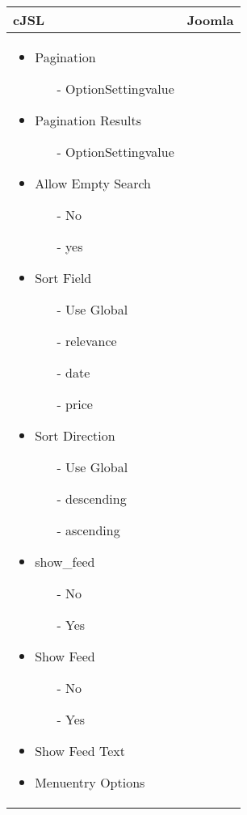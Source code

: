 \begin{minipage}{0.7\textwidth}
\begin{tabular}{|p{} | p{}|}
\hline
\textbf{cJSL} & \textbf{Joomla} \\ 
\hline
\begin{itemize}
\item Pagination
\begin{enumerate}
 	\item[-] OptionSettingvalue
 \end{enumerate}
\item Pagination Results
\begin{enumerate}
 	\item[-] OptionSettingvalue
 \end{enumerate} 
\item Allow Empty Search
\begin{enumerate}
 	\item[-] No
 	\item[-] yes 
 \end{enumerate} 
\item Sort Field
\begin{enumerate}
 	\item[-] Use Global
 	\item[-] relevance
 	\item[-] date
 	\item[-] price
 \end{enumerate} 
\item Sort Direction
\begin{enumerate}
 	\item[-] Use Global
 	\item[-] descending
 	\item[-] ascending
 \end{enumerate} 
\item show\_feed
\begin{enumerate}
 	\item[-] No
 	\item[-] Yes
 \end{enumerate} 
\item Show Feed
\begin{enumerate}
 	\item[-] No
 	\item[-] Yes
 \end{enumerate} 
\item Show Feed Text 
\item Menuentry Options
\end{itemize}

\end{tabular}
\end{minipage}
